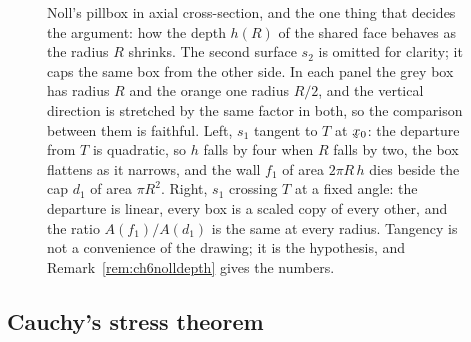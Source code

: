 \begin{figure}[htbp]
\caption{Noll's pillbox in axial cross-section, and the one thing that
decides the argument: how the depth $h(R)$ of the shared face behaves
as the radius $R$ shrinks. The second surface $s_{2}$ is omitted for
clarity; it caps the same box from the other side. In each panel the
grey box has radius $R$ and the orange one radius $R/2$, and the
vertical direction is stretched by the same factor in both, so the
comparison between them is faithful. Left, $s_{1}$ tangent to $T$ at
$\bx_{0}$: the departure from $T$ is quadratic, so $h$ falls by four
when $R$ falls by two, the box flattens as it narrows, and the wall
$f_{1}$ of area $2\pi R\,h$ dies beside the cap $d_{1}$ of area
$\pi R^{2}$. Right, $s_{1}$ crossing $T$ at a fixed angle: the
departure is linear, every box is a scaled copy of every other, and the
ratio $A(f_{1})/A(d_{1})$ is the same at every radius. Tangency is not
a convenience of the drawing; it is the hypothesis, and
Remark~\ref{rem:ch6nolldepth} gives the numbers.}
\label{fig:ch6noll}
\end{figure}

\subsection{Cauchy's stress theorem}\label{sec:ch6cauchythm}

